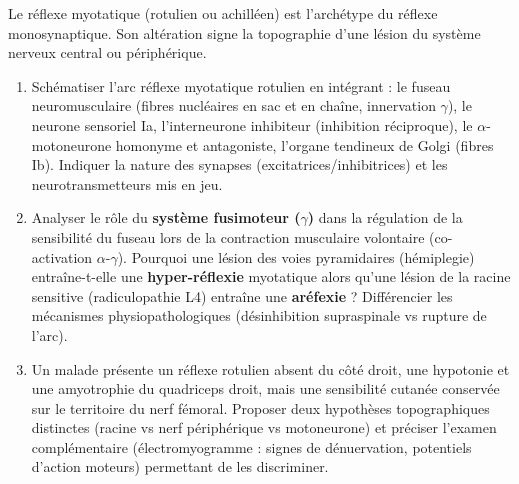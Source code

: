 \documentclass[11pt]{article}
\begin{document}
\begin{exercice}
Le réflexe myotatique (rotulien ou achilléen) est l'archétype du réflexe monosynaptique. Son altération signe la topographie d'une lésion du système nerveux central ou périphérique.
\begin{enumerate}
    \item Schématiser l'arc réflexe myotatique rotulien en intégrant : le fuseau neuromusculaire (fibres nucléaires en sac et en chaîne, innervation $\gamma$), le neurone sensoriel Ia, l'interneurone inhibiteur (inhibition réciproque), le $\alpha$-motoneurone homonyme et antagoniste, l'organe tendineux de Golgi (fibres Ib). Indiquer la nature des synapses (excitatrices/inhibitrices) et les neurotransmetteurs mis en jeu.
    \item Analyser le rôle du \textbf{système fusimoteur ($\gamma$)} dans la régulation de la sensibilité du fuseau lors de la contraction musculaire volontaire (co-activation $\alpha$-$\gamma$). Pourquoi une lésion des voies pyramidaires (hémiplegie) entraîne-t-elle une \textbf{hyper-réflexie} myotatique alors qu'une lésion de la racine sensitive (radiculopathie L4) entraîne une \textbf{aréfexie} ? Différencier les mécanismes physiopathologiques (désinhibition supraspinale vs rupture de l'arc).
    \item Un malade présente un réflexe rotulien absent du côté droit, une hypotonie et une amyotrophie du quadriceps droit, mais une sensibilité cutanée conservée sur le territoire du nerf fémoral. Proposer deux hypothèses topographiques distinctes (racine vs nerf périphérique vs motoneurone) et préciser l'examen complémentaire (électromyogramme : signes de dénuervation, potentiels d'action moteurs) permettant de les discriminer.
\end{enumerate}
\end{exercice}
\end{document}
